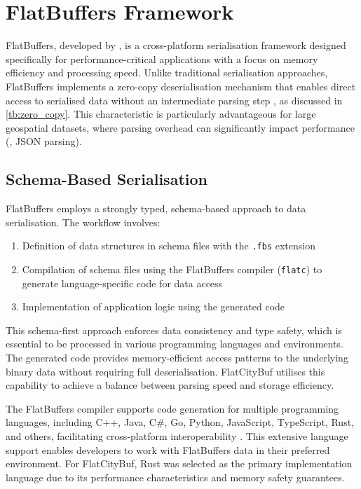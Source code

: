 
\section{FlatBuffers Framework}
\label{tb:flatbuffers}

FlatBuffers, developed by \citet{flatbuffers}, is a cross-platform serialisation framework designed specifically for performance-critical applications with a focus on memory efficiency and processing speed. Unlike traditional serialisation approaches, FlatBuffers implements a zero-copy deserialisation mechanism that enables direct access to serialised data without an intermediate parsing step \citep{flatbuffers_benchmark}, as discussed in \autoref{tb:zero_copy}.
This characteristic is particularly advantageous for large geospatial datasets, where parsing overhead can significantly impact performance (\eg, JSON parsing).

\subsection{Schema-Based Serialisation}
\label{tb:flatbuffers:schema_based_serialisation}

FlatBuffers employs a strongly typed, schema-based approach to data serialisation. The workflow involves:

\begin{enumerate}
  \item Definition of data structures in schema files with the \texttt{.fbs} extension
  \item Compilation of schema files using the FlatBuffers compiler (\texttt{flatc}) to generate language-specific code for data access
  \item Implementation of application logic using the generated code
\end{enumerate}

This schema-first approach enforces data consistency and type safety, which is essential to be processed in various programming languages and environments. The generated code provides memory-efficient access patterns to the underlying binary data without requiring full deserialisation. FlatCityBuf utilises this capability to achieve a balance between parsing speed and storage efficiency.

The FlatBuffers compiler supports code generation for multiple programming languages, including C++, Java, C\#, Go, Python, JavaScript, TypeScript, Rust, and others, facilitating cross-platform interoperability \citep{flatbuffers_support}. This extensive language support enables developers to work with FlatBuffers data in their preferred environment. For FlatCityBuf, Rust was selected as the primary implementation language due to its performance characteristics and memory safety guarantees.

